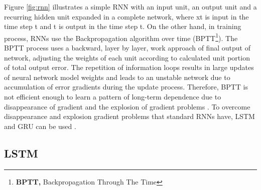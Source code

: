 Figure \ref{fig:rnn} illustrates a simple RNN with an input unit, an output unit and a recurring hidden unit expanded in a complete network, where xt is input in the time step t and t is output in the time step t. On the other hand, in training process, RNNs use the Backpropagation algorithm over time (BPTT\footnote{\textbf{BPTT,} Backpropagation Through The Time}). The BPTT process uses a backward, layer by layer, work approach of final output of network, adjusting the weights of each unit according to calculated unit portion of total output error. The repetition of information loops results in large updates of neural network model weights and leads to an unstable network due to accumulation of error gradients during the update process. Therefore, BPTT is not efficient enough to learn a pattern of long-term dependence due to disappearance of gradient and the explosion of gradient problems \cite{Reference50}. To overcome disappearance and explosion gradient problems that standard RNNs have, LSTM and GRU can be used \cite{Reference51}.

\subsection{LSTM}

